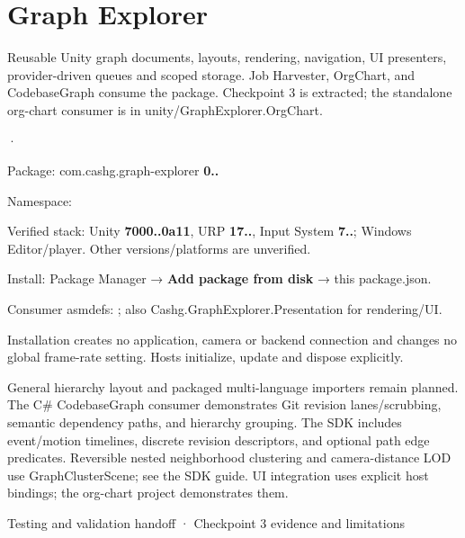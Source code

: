 \chapter{Graph Explorer }
\hypertarget{md__r_e_a_d_m_e}{}\label{md__r_e_a_d_m_e}
\label{md__r_e_a_d_m_e_autotoc_md182}%
%


Reusable Unity graph documents, layouts, rendering, navigation, UI presenters, provider-\/driven queues and scoped storage. Job Harvester, Org\+Chart, and Codebase\+Graph consume the package. Checkpoint 3 is extracted; the standalone org-\/chart consumer is in {\ttfamily unity/\+\+Graph\+Explorer.Org\+Chart}.

{\bfseries{}} · {\bfseries{}}


\begin{DoxyItemize}
\item Package: {\ttfamily com.\+cashg.\+graph-\/explorer} {\bfseries{0..}}
\item Namespace: {\ttfamily {}}
\item Verified stack: Unity {\bfseries{7000..\+0a11}}, URP {\bfseries{17..}}, Input System {\bfseries{7..}}; Windows Editor/\+player. Other versions/\+platforms are unverified.
\item Install: Package Manager → {\bfseries{Add package from disk}} → this {\ttfamily package.\+json}.
\item Consumer asmdefs: {\ttfamily {}}; also {\ttfamily Cashg.\+Graph\+Explorer.\+Presentation} for rendering/\+\+UI.
\item Installation creates no application, camera or backend connection and changes no global frame-\/rate setting. Hosts initialize, update and dispose explicitly.
\item General hierarchy layout and packaged multi-\/language importers remain planned. The C\# Codebase\+Graph consumer demonstrates Git revision lanes/\+scrubbing, semantic dependency paths, and hierarchy grouping. The SDK includes event/\+motion timelines, discrete revision descriptors, and optional path edge predicates. Reversible nested neighborhood clustering and camera-\/distance LOD use {\ttfamily Graph\+Cluster\+Scene}; see the SDK guide. UI integration uses explicit host bindings; the org-\/chart project demonstrates them.
\end{DoxyItemize}

Testing and validation handoff · Checkpoint 3 evidence and limitations 